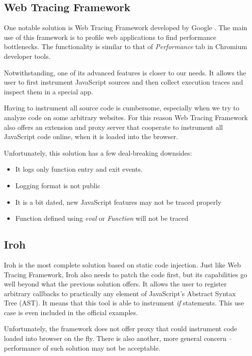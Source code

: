 \subsection{Web Tracing Framework}
One notable solution is Web Tracing Framework developed by Google \cite{google:wtf}.
The main use of this framework is to profile web applications to find performance bottlenecks.
The functionality is similar to that of \emph{Performance} tab in Chromium developer tools.

Notwithstanding, one of its advanced features is closer to our needs. 
It allows the user to first instrument JavaScript sources and then 
collect execution traces and inspect them in a special app.

Having to instrument all source code is cumbersome, especially when we try to analyze code on some
arbitrary websites. For this reason Web Tracing Framework also offers an extension and proxy server 
that cooperate to instrument all JavaScript code online, when it is loaded into the browser.

Unfortunately, this solution has a few deal-breaking downsides:
\begin{itemize}
  \item It logs only function entry and exit events.
  \item Logging format is not public
  \item It is a bit dated, new JavaScript features may not be traced properly
  \item Function defined using \emph{eval} or \emph{Function} will not be traced
\end{itemize}

\subsection{Iroh}
Iroh \cite{iroh} is the most complete solution based on static code injection.
Just like Web Tracing Framework, Iroh also needs to patch the code first, but its capabilities go well
beyond what the previous solution offers. It allows the user to register arbitrary callbacks to practically any
element of JavaScript's Abstract Syntax Tree (AST). It means that this tool is able to instrument \emph{if} statements.
This use case is even included in the official examples.

Unfortunately, the framework does not offer proxy that could instrument code loaded into browser on the fly.
There is also another, more general concern -- performance of such solution may not be acceptable.

